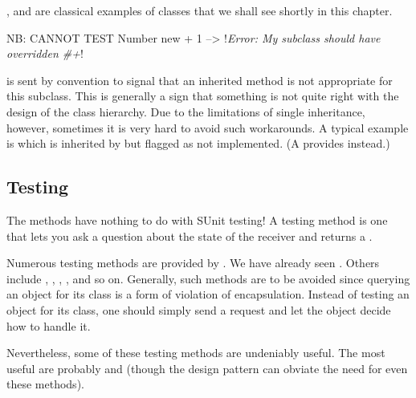 \documentclass[a4paper,10pt,twoside]{book}
\begin{document}
,  and  are classical examples of  classes that we shall see shortly in this chapter.

\begin{code}{NB: CANNOT TEST}
Number new + 1 --> !\emph{Error: My subclass should have overridden \#+}!
\end{code}

 is sent by convention to signal that an inherited method is not appropriate for this subclass.
This is generally a sign that something is not quite right with the design of the class hierarchy.
Due to the limitations of single inheritance, however, sometimes it is very hard to avoid such workarounds. 
A typical example is  which is inherited by  but flagged as not implemented.
(A  provides  instead.)


\subsection{Testing}

The  methods have nothing to do with SUnit testing!
A testing method is one that lets you ask a question about the state of the receiver and returns a .

Numerous testing methods are provided by .
We have already seen .
Others include , , , , and so on.
Generally, such methods are to be avoided since querying an object for its class is a form of violation of encapsulation.
Instead of testing an object for its class, one should simply send a request and let the object decide how to handle it.

Nevertheless, some of these testing methods are undeniably useful.
The most useful are probably  and  (though the \cite{Wool98a} design pattern can obviate the need for even these methods).

\end{document}
